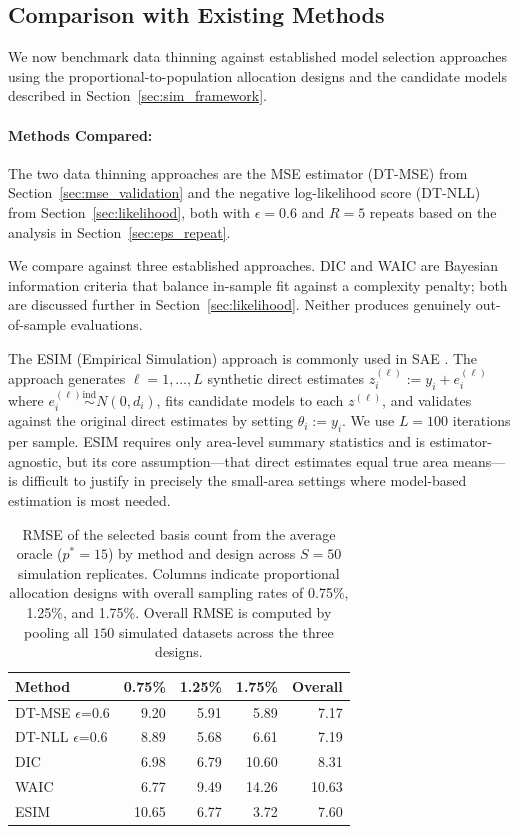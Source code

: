 \documentclass[11pt]{article}
\newcommand{\ind}{\stackrel{\text{ind}}{\sim}}
\theoremstyle{plain}
\theoremstyle{definition}
\theoremstyle{remark}
\begin{document}
\subsection{Comparison with Existing Methods}\label{sec:method_comparison}

We now benchmark data thinning against established model selection
approaches using the proportional-to-population allocation designs and
the candidate models described in Section~\ref{sec:sim_framework}.

\paragraph{Methods Compared:} The two data thinning approaches are the
MSE estimator (DT-MSE) from Section~\ref{sec:mse_validation} and the
negative log-likelihood score (DT-NLL) from
Section~\ref{sec:likelihood}, both with $\epsilon = 0.6$ and $R = 5$
repeats based on the analysis in Section~\ref{sec:eps_repeat}.

We compare against three established approaches. DIC
\citep{spiegelhalter_bayesian_2002} and WAIC
\citep{watanabe_asymptotic_2010} are Bayesian information criteria that
balance in-sample fit against a complexity penalty; both are discussed
further in Section~\ref{sec:likelihood}. Neither produces genuinely
out-of-sample evaluations.

The ESIM (Empirical Simulation) approach is commonly used in SAE
\citep{bradley_multivariate_2015, janicki_bayesian_2022}. The approach
generates $\ell = 1, \ldots, L$ synthetic direct estimates
$z^{(\ell)}_i := y_i + e^{(\ell)}_i$ where
$e^{(\ell)}_i \ind N(0, d_i)$, fits candidate models to each
$z^{(\ell)}$, and validates against the original direct estimates by
setting $\theta_i := y_i$. We use $L = 100$ iterations per sample. ESIM
requires only area-level summary statistics and is estimator-agnostic,
but its core assumption---that direct estimates equal true area
means---is difficult to justify in precisely the small-area settings
where model-based estimation is most needed.

\begin{table}[ht]
\centering
\begin{tabular}{l rrrr}
  \toprule
  Method & 0.75\% & 1.25\% & 1.75\% & Overall \\
  \midrule
  DT-MSE $\epsilon$=0.6 & 9.20 & 5.91 & 5.89 & 7.17 \\
  DT-NLL $\epsilon$=0.6 & 8.89 & 5.68 & 6.61 & 7.19 \\
  DIC & 6.98 & 6.79 & 10.60 & 8.31 \\
  WAIC & 6.77 & 9.49 & 14.26 & 10.63 \\
  ESIM & 10.65 & 6.77 & 3.72 & 7.60 \\
  \bottomrule
\end{tabular}
\caption{RMSE of the selected basis count from the average oracle
($p^* = 15$) by method and design across $S = 50$ simulation replicates.
Columns indicate proportional allocation designs with overall sampling
rates of 0.75\%, 1.25\%, and 1.75\%. Overall RMSE is computed by pooling all $150$ simulated datasets across the three designs.}
\label{tab:comparison}
\end{table}
\end{document}
